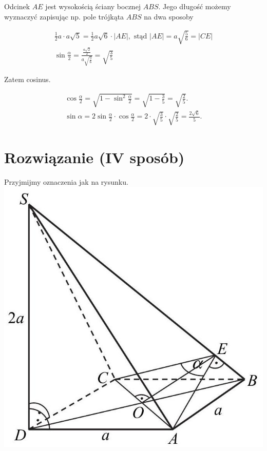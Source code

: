 \documentclass[10pt]{article}
\begin{document}
Odcinek $A E$ jest wysokością ściany bocznej $A B S$. Jego długość możemy wyznaczyć zapisując np. pole trójkąta $A B S$ na dwa sposoby

$$
\begin{gathered}
\frac{1}{2} a \cdot a \sqrt{5}=\frac{1}{2} a \sqrt{6} \cdot|A E|, \text { stąd }|A E|=a \sqrt{\frac{5}{6}}=|C E| \\
\sin \frac{\alpha}{2}=\frac{\frac{a \sqrt{2}}{2}}{a \sqrt{\frac{5}{6}}}=\sqrt{\frac{3}{5}}
\end{gathered}
$$

Zatem cosinus.

$$
\begin{gathered}
\cos \frac{\alpha}{2}=\sqrt{1-\sin ^{2} \frac{\alpha}{2}}=\sqrt{1-\frac{3}{5}}=\sqrt{\frac{2}{5}} . \\
\sin \alpha=2 \sin \frac{\alpha}{2} \cdot \cos \frac{\alpha}{2}=2 \cdot \sqrt{\frac{3}{5}} \cdot \sqrt{\frac{2}{5}}=\frac{2 \sqrt{6}}{5} .
\end{gathered}
$$

\section*{Rozwiązanie (IV sposób)}
Przyjmijmy oznaczenia jak na rysunku.\\
\includegraphics[max width=\textwidth, center]{2025_02_07_f5f4e8f37e6baab02e47g-24(1)}
\end{document}
